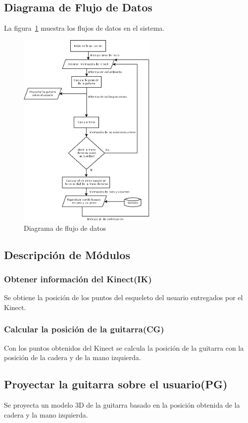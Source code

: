 \documentclass[a4paper,12pt]{article}
\begin{document}
\subsection{Diagrama de Flujo de Datos}

La figura~\ref{fig:flujo} muestra los flujos de datos en el sistema.

\begin{figure}[h!]
        \centering
        \includegraphics[width=0.6\textwidth]{../imagenes/diagrama_de_flujo.png}
        \caption{Diagrama de flujo de datos}
        \label{fig:flujo}
\end{figure}
\newpage

\subsection{Descripción de Módulos}
\subsubsection{Obtener información del Kinect(IK)}
Se obtiene la posición de los puntos del esqueleto del usuario entregados por el
Kinect.
\subsubsection{Calcular la posición de la guitarra(CG)}
Con los puntos obtenidos del Kinect se calcula la posición de la guitarra con la
posición de la cadera y de la mano izquierda.
\subsection{Proyectar la guitarra sobre el usuario(PG)}
Se proyecta un modelo 3D de la guitarra basado en la posición obtenida de la
cadera y la mano izquierda.
\end{document}
